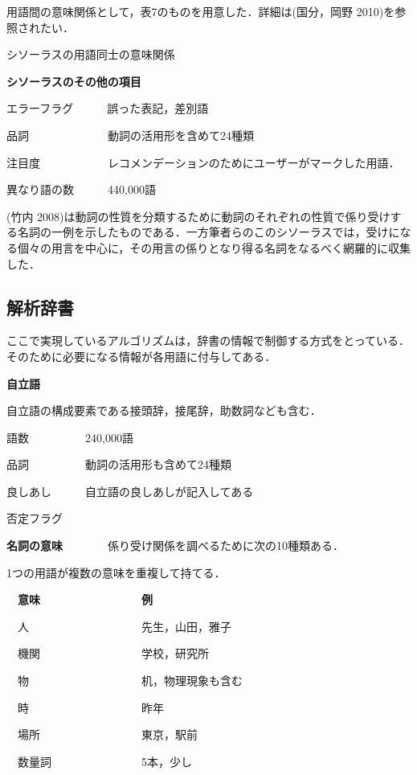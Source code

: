 \documentclass[japanese]{jnlp_1.4}
\begin{document}
用語間の意味関係として，表7のものを用意した．詳細は(国分，岡野 2010)を参照されたい．


\begin{table}[b]
 \caption{シソーラスの用語同士の意味関係}

\end{table}


{\bfseries シソーラスのその他の項目}

エラーフラグ　　　誤った表記，差別語

品詞　　　　　　　動詞の活用形を含めて24種類

注目度　　　　　　レコメンデーションのためにユーザーがマークした用語．

異なり語の数　　　440,000語

 (竹内 2008)は動詞の性質を分類するために動詞のそれぞれの性質で係り受けする名詞の一例を示したものである．一方筆者らのこのシソーラスでは，受けになる個々の用言を中心に，その用言の係りとなり得る名詞をなるべく網羅的に収集した．



\subsection{解析辞書}

ここで実現しているアルゴリズムは，辞書の情報で制御する方式をとっている．そのために必要になる情報が各用語に付与してある．

{\bfseries 自立語}

自立語の構成要素である接頭辞，接尾辞，助数詞なども含む．

語数　　　　　240,000語

品詞　　　　　動詞の活用形も含めて24種類

良しあし　　　自立語の良しあしが記入してある

否定フラグ

{\bfseries 名詞の意味}　　　　係り受け関係を調べるために次の10種類ある．

1つの用語が複数の意味を重複して持てる．

　{\bfseries 意味　　　　　　　　　例}

　人　　　　　　　　　　先生，山田，雅子

　機関　　　　　　　　　学校，研究所

　物　　　　　　　　　　机，物理現象も含む

　時　　　　　　　　　　昨年

　場所　　　　　　　　　東京，駅前

　数量詞　　　　　　　　5本，少し
\end{document}
